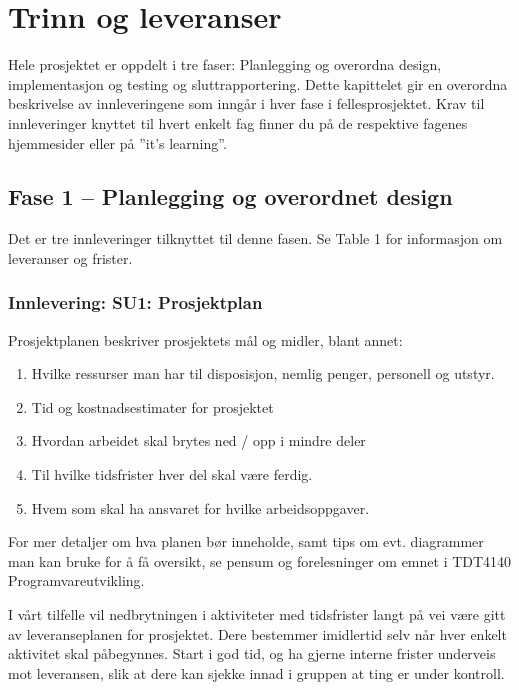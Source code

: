 \section{Trinn og leveranser}

Hele prosjektet er oppdelt i tre faser: Planlegging og overordna design, implementasjon og testing og sluttrapportering. Dette kapittelet gir en overordna beskrivelse av innleveringene som inngår i hver fase i fellesprosjektet. Krav til innleveringer knyttet til hvert enkelt fag finner du på de respektive fagenes hjemmesider eller på ”it’s learning”.

\subsection{Fase 1 – Planlegging og overordnet design}

Det er tre innleveringer tilknyttet til denne fasen. Se Table 1 for informasjon om leveranser og frister. 

\subsubsection{Innlevering: SU1: Prosjektplan}

Prosjektplanen beskriver prosjektets mål og midler, blant annet:

\begin{enumerate}

\item
Hvilke ressurser man har til disposisjon, nemlig penger, personell og utstyr.

\item
Tid og kostnadsestimater for prosjektet

\item
Hvordan arbeidet skal brytes ned / opp i mindre deler

\item
Til hvilke tidsfrister hver del skal være ferdig.

\item
Hvem som skal ha ansvaret for hvilke arbeidsoppgaver.

\end{enumerate}

For mer detaljer om hva planen bør inneholde, samt tips om evt. diagrammer man kan bruke for å få oversikt, se pensum og forelesninger om emnet i TDT4140 Programvareutvikling.

I vårt tilfelle vil nedbrytningen i aktiviteter med tidsfrister langt på vei være gitt av leveranseplanen for prosjektet. Dere bestemmer imidlertid selv når hver enkelt aktivitet skal påbegynnes. Start i god tid, og ha gjerne interne frister underveis mot leveransen, slik at dere kan sjekke innad i gruppen at ting er under kontroll.

